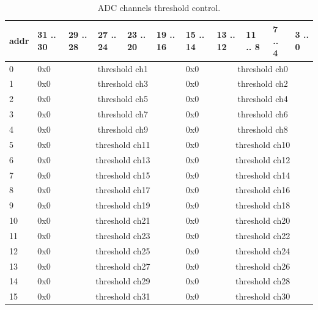 \documentclass{article}
\begin{document}
\begin{table}[H]
\centering
\begin{tabular}{| l | l | l | l | l | l | l | l | l | l | l |}
\hline
addr & 31 .. 30 & 29 .. 28 & 27 .. 24 & 23 .. 20 & 19 .. 16 & 15 .. 14 & 13 .. 12 & 11 .. 8 & 7 .. 4 & 3 .. 0 \\ \hline
0 & 0x0 & \multicolumn{4}{c|}{threshold ch1} & 0x0 & \multicolumn{4}{c|}{threshold ch0} \\ \hline
1 & 0x0 & \multicolumn{4}{c|}{threshold ch3} & 0x0 & \multicolumn{4}{c|}{threshold ch2} \\ \hline
2 & 0x0 & \multicolumn{4}{c|}{threshold ch5} & 0x0 & \multicolumn{4}{c|}{threshold ch4} \\ \hline
3 & 0x0 & \multicolumn{4}{c|}{threshold ch7} & 0x0 & \multicolumn{4}{c|}{threshold ch6} \\ \hline
4 & 0x0 & \multicolumn{4}{c|}{threshold ch9} & 0x0 & \multicolumn{4}{c|}{threshold ch8} \\ \hline
5 & 0x0 & \multicolumn{4}{c|}{threshold ch11} & 0x0 & \multicolumn{4}{c|}{threshold ch10} \\ \hline
6 & 0x0 & \multicolumn{4}{c|}{threshold ch13} & 0x0 & \multicolumn{4}{c|}{threshold ch12} \\ \hline
7 & 0x0 & \multicolumn{4}{c|}{threshold ch15} & 0x0 & \multicolumn{4}{c|}{threshold ch14} \\ \hline
8 & 0x0 & \multicolumn{4}{c|}{threshold ch17} & 0x0 & \multicolumn{4}{c|}{threshold ch16} \\ \hline
9 & 0x0 & \multicolumn{4}{c|}{threshold ch19} & 0x0 & \multicolumn{4}{c|}{threshold ch18} \\ \hline
10 & 0x0 & \multicolumn{4}{c|}{threshold ch21} & 0x0 & \multicolumn{4}{c|}{threshold ch20} \\ \hline
11 & 0x0 & \multicolumn{4}{c|}{threshold ch23} & 0x0 & \multicolumn{4}{c|}{threshold ch22} \\ \hline
12 & 0x0 & \multicolumn{4}{c|}{threshold ch25} & 0x0 & \multicolumn{4}{c|}{threshold ch24} \\ \hline
13 & 0x0 & \multicolumn{4}{c|}{threshold ch27} & 0x0 & \multicolumn{4}{c|}{threshold ch26} \\ \hline
14 & 0x0 & \multicolumn{4}{c|}{threshold ch29} & 0x0 & \multicolumn{4}{c|}{threshold ch28} \\ \hline
15 & 0x0 & \multicolumn{4}{c|}{threshold ch31} & 0x0 & \multicolumn{4}{c|}{threshold ch30} \\ \hline
\end{tabular}
\caption{ADC channels threshold control.\label{tab2}}
\end{table}
\end{document}
